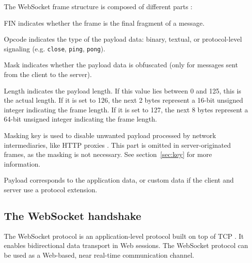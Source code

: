 \documentclass[10pt,journal,compsoc]{IEEEtran}
\newcommand{\ttt}[1]{\texttt{#1}}
\newcommand{\ws}{WebSocket}
\begin{document}
The \ws{} frame structure is composed of different parts \cite{HighPerfBrowserNetworking:websocket} \cite{performanceEvaluationOfWebsocketProtocol} :
\begin{LaTeXdescription}    %
    \item[FIN] indicates whether the frame is the final fragment of a message. %
    \item[Opcode] indicates the type of the payload data: binary, textual, or protocol-level signaling (e.g. \ttt{close}, \ttt{ping}, \ttt{pong}).
    \item[Mask] indicates whether the payload data is obfuscated (only for messages sent from the client to the server).
    \item[Length] indicates the payload length. If this value lies between 0 and 125, this is the actual length.
                    If it is set to 126, the next 2 bytes represent a 16-bit unsigned integer indicating the frame length.
                    If it is set to 127, the next 8 bytes represent a 64-bit unsigned integer indicating the frame length.
    \item[Masking key] is used to disable unwanted payload processed by network intermediaries, like HTTP proxies \cite{performanceEvaluationOfWebsocketProtocol}.
                    This part is omitted in server-originated frames, as the masking is not necessary. See section~\ref{sec:key} for more information.
    \item[Payload] corresponds to the application data, or custom data if the client and server use a protocol extension.
\end{LaTeXdescription}




\subsection{The \ws{} handshake}
\label{handshake}
The \ws{} protocol is an application-level protocol built on top of TCP \cite{rfc6455}.
It enables bidirectional data transport in Web sessions.
The \ws{} protocol can be used as a Web-based, near real-time communication channel. %
\end{document}
